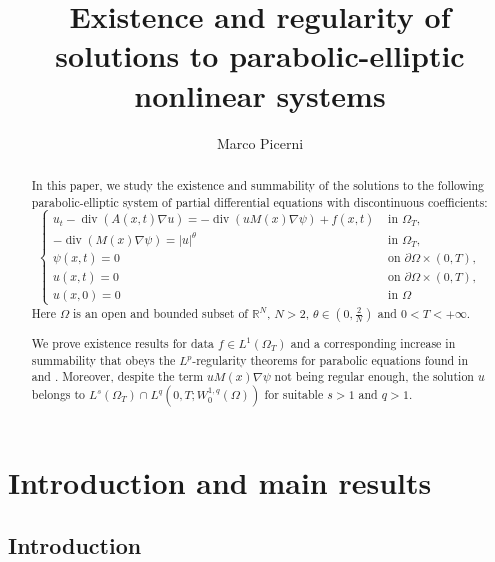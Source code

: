 \documentclass{amsart}
\title{Existence and regularity of solutions to parabolic-elliptic nonlinear systems}
\author{Marco Picerni
\orcidlink{0009-0004-4364-4831}}\email{mpicerni@sissa.it}
\numberwithin{equation}{section}
\def\elle#1{L^{#1}}
\def\elleomT#1{L^{#1}(\Omega_T)}
\def\Sobom#1{W^{1,#1}_0(\Omega)}
\def\R{\mathbb{R}}
\begin{document}
\begin{abstract}
    In this paper, we study the existence and summability of the solutions to the following parabolic-elliptic system of partial differential equations with discontinuous coefficients:
\begin{equation*}
    \left\{\begin{array}{cc}
    u_t-\operatorname{div}(A(x, t) \nabla u)=-\operatorname{div}(u M(x) \nabla \psi)+f(x,t) & \text { in } \Omega_T, \\
    -\operatorname{div}(M(x) \nabla \psi)=|u|^\theta & \text { in } \Omega_T, \\
    \psi(x, t)=0 & \text { on } \partial\Omega\times(0, T), \\
    u(x, t)=0 & \text { on } \partial\Omega\times(0, T), \\
    u(x, 0)=0 & \text { in } \Omega
    \end{array}\right.
\end{equation*}
Here $\Omega$ is an open and bounded subset of $\R^N$, $N>2$, $\theta\in(0,\frac{2}{N})$ and $0<T<+\infty$. 

We prove existence results for data $f\in\elleomT 1$ and a corresponding increase in summability that obeys the $L^p$-regularity theorems for parabolic equations found in \cite{Aronson-Serrin} and \cite{BDGO-parabolic}. Moreover, despite the term $u M(x)\nabla\psi$ not being regular enough, the solution $u$ belongs to $\elleomT s\cap \elle q(0,T;\Sobom q)$ for suitable $s>1$ and $q>1$.
\end{abstract}

\maketitle

\section{Introduction and main results}

\subsection{Introduction}
\end{document}
